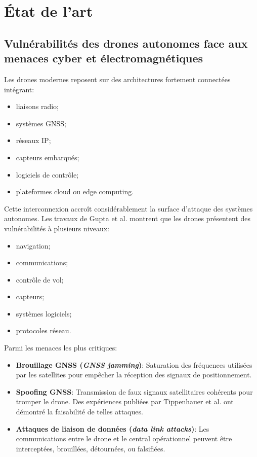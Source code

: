\documentclass[12pt, a4paper, twoside, openright]{report}
\begin{document}
\section{État de l’art}

\subsection{Vulnérabilités des drones autonomes face aux menaces cyber et électromagnétiques}
Les drones modernes reposent sur des architectures fortement connectées intégrant:
\begin{itemize}
    \item liaisons radio;
    \item systèmes GNSS;
    \item réseaux IP;
    \item capteurs embarqués;
    \item logiciels de contrôle;
    \item plateformes cloud ou edge computing.
\end{itemize}

Cette interconnexion accroît considérablement la surface d’attaque des systèmes autonomes. Les travaux de Gupta et al. \cite{gupta2020cyber} montrent que les drones présentent des vulnérabilités à plusieurs niveaux:
\begin{itemize}
    \item navigation;
    \item communications;
    \item contrôle de vol;
    \item capteurs;
    \item systèmes logiciels;
    \item protocoles réseau.
\end{itemize}

Parmi les menaces les plus critiques:
\begin{itemize}
    \item \textbf{Brouillage GNSS (\textit{GNSS jamming})}: Saturation des fréquences utilisées par les satellites pour empêcher la réception des signaux de positionnement.
    \item \textbf{Spoofing GNSS}: Transmission de faux signaux satellitaires cohérents pour tromper le drone. Des expériences publiées par Tippenhauer et al. \cite{tippenhauer2015gnss} ont démontré la faisabilité de telles attaques.
    \item \textbf{Attaques de liaison de données (\textit{data link attacks})}: Les communications entre le drone et le central opérationnel peuvent être interceptées, brouillées, détournées, ou falsifiées.
\end{itemize}
\end{document}
